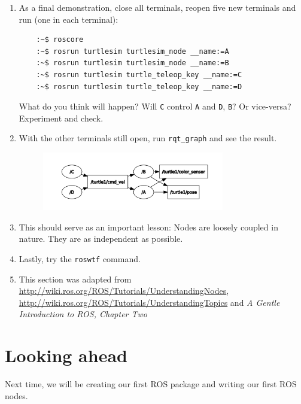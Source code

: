 \documentclass{article}
\begin{document}
\begin{enumerate}
        \item As a final demonstration, close all terminals, reopen five new terminals and run (one in each terminal):
        \begin{verbatim}
    :~$ roscore 
    :~$ rosrun turtlesim turtlesim_node __name:=A
    :~$ rosrun turtlesim turtlesim_node __name:=B
    :~$ rosrun turtlesim turtle_teleop_key __name:=C
    :~$ rosrun turtlesim turtle_teleop_key __name:=D
        \end{verbatim}
        What do you think will happen? Will \texttt{C} control \texttt{A} and \texttt{D}, \texttt{B}? Or vice-versa? Experiment and check.
        \item With the other terminals still open, run \texttt{rqt\_graph} and see the result.
        \begin{figure}[H]
            \center
            \includegraphics[width = 0.75\textwidth]{graph3.png}
        \end{figure}
        \item This should serve as an important lesson: Nodes are loosely coupled in nature. They are as independent as possible.
        \item Lastly, try the \texttt{roswtf} command.
        \item This section was adapted from \url{http://wiki.ros.org/ROS/Tutorials/UnderstandingNodes}, \url{http://wiki.ros.org/ROS/Tutorials/UnderstandingTopics}
        and \emph{A Gentle Introduction to ROS, Chapter Two}
    \end{enumerate}
    \section{Looking ahead}
    Next time, we will be creating our first ROS package and writing our first ROS nodes. 
\end{document}
